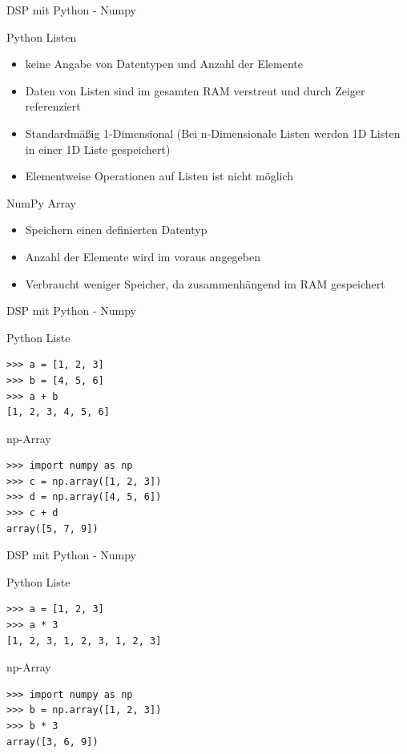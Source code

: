 \documentclass[8pt]{beamer}
\begin{document}
\begin{frame}[label={sec:org6404beb}]{DSP mit Python - Numpy}
\begin{block}{Python Listen}
\begin{itemize}
\item keine Angabe von Datentypen und Anzahl der Elemente
\item Daten von Listen sind im gesamten RAM verstreut und durch Zeiger referenziert
\item Standardmäßig 1-Dimensional (Bei n-Dimensionale Listen werden 1D Listen in einer 1D Liste gespeichert)
\item Elementweise Operationen auf Listen ist nicht möglich
\end{itemize}
\end{block}

\begin{block}{NumPy Array}
\begin{itemize}
\item Speichern einen definierten Datentyp
\item Anzahl der Elemente wird im voraus angegeben
\item Verbraucht weniger Speicher, da zusammenhängend im RAM gespeichert
\end{itemize}
\end{block}
\end{frame}


\begin{frame}[fragile,label={sec:orge388cf4}]{DSP mit Python - Numpy}
 \begin{block}{Python Liste}
\begin{verbatim}
>>> a = [1, 2, 3]
>>> b = [4, 5, 6]
>>> a + b
[1, 2, 3, 4, 5, 6]
\end{verbatim}
\end{block}
\begin{block}{np-Array}
\begin{verbatim}
>>> import numpy as np
>>> c = np.array([1, 2, 3])
>>> d = np.array([4, 5, 6])
>>> c + d
array([5, 7, 9])
\end{verbatim}
\end{block}
\end{frame}


\begin{frame}[fragile,label={sec:org262102d}]{DSP mit Python - Numpy}
 \begin{block}{Python Liste}
\begin{verbatim}
>>> a = [1, 2, 3]
>>> a * 3
[1, 2, 3, 1, 2, 3, 1, 2, 3]
\end{verbatim}
\end{block}
\begin{block}{np-Array}
\begin{verbatim}
>>> import numpy as np
>>> b = np.array([1, 2, 3])
>>> b * 3
array([3, 6, 9])
\end{verbatim}
\end{block}
\end{frame}
\end{document}
